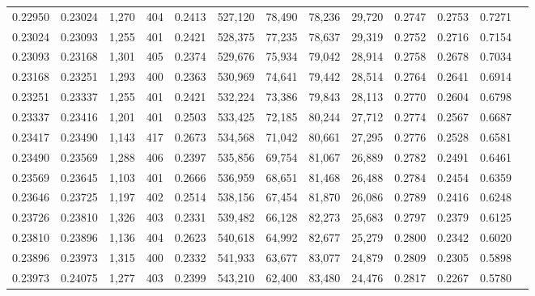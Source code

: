 \begin{tabular}{rrrrrrrrrrrrr}
0.22950 & 0.23024 & 1,270 & 404 &                                     0.2413 & 527,120 &  78,490 &  78,236 &  29,720 & 0.2747 & 0.2753 & 0.7271 \\
0.23024 & 0.23093 & 1,255 & 401 &                                     0.2421 & 528,375 &  77,235 &  78,637 &  29,319 & 0.2752 & 0.2716 & 0.7154 \\
0.23093 & 0.23168 & 1,301 & 405 &                                     0.2374 & 529,676 &  75,934 &  79,042 &  28,914 & 0.2758 & 0.2678 & 0.7034 \\
0.23168 & 0.23251 & 1,293 & 400 &                                     0.2363 & 530,969 &  74,641 &  79,442 &  28,514 & 0.2764 & 0.2641 & 0.6914 \\
0.23251 & 0.23337 & 1,255 & 401 &                                     0.2421 & 532,224 &  73,386 &  79,843 &  28,113 & 0.2770 & 0.2604 & 0.6798 \\
0.23337 & 0.23416 & 1,201 & 401 &                                     0.2503 & 533,425 &  72,185 &  80,244 &  27,712 & 0.2774 & 0.2567 & 0.6687 \\
0.23417 & 0.23490 & 1,143 & 417 &                                     0.2673 & 534,568 &  71,042 &  80,661 &  27,295 & 0.2776 & 0.2528 & 0.6581 \\
0.23490 & 0.23569 & 1,288 & 406 &                                     0.2397 & 535,856 &  69,754 &  81,067 &  26,889 & 0.2782 & 0.2491 & 0.6461 \\
0.23569 & 0.23645 & 1,103 & 401 &                                     0.2666 & 536,959 &  68,651 &  81,468 &  26,488 & 0.2784 & 0.2454 & 0.6359 \\
0.23646 & 0.23725 & 1,197 & 402 &                                     0.2514 & 538,156 &  67,454 &  81,870 &  26,086 & 0.2789 & 0.2416 & 0.6248 \\
0.23726 & 0.23810 & 1,326 & 403 &                                     0.2331 & 539,482 &  66,128 &  82,273 &  25,683 & 0.2797 & 0.2379 & 0.6125 \\
0.23810 & 0.23896 & 1,136 & 404 &                                     0.2623 & 540,618 &  64,992 &  82,677 &  25,279 & 0.2800 & 0.2342 & 0.6020 \\
0.23896 & 0.23973 & 1,315 & 400 &                                     0.2332 & 541,933 &  63,677 &  83,077 &  24,879 & 0.2809 & 0.2305 & 0.5898 \\
0.23973 & 0.24075 & 1,277 & 403 &                                     0.2399 & 543,210 &  62,400 &  83,480 &  24,476 & 0.2817 & 0.2267 & 0.5780 \\

\end{tabular}
